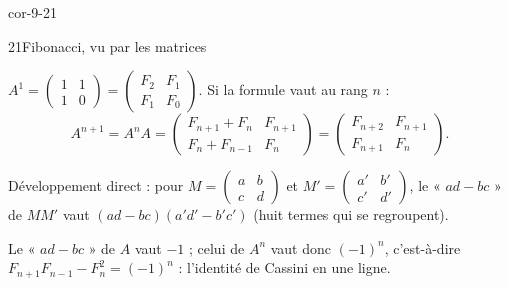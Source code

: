 \begin{blocLivre}{cor-9-21}
\begin{corrige}{21}{Fibonacci, vu par les matrices}
\begin{questions}
  \item {} $A^{1}=\begin{pmatrix}1&1\\1&0\end{pmatrix}
    =\begin{pmatrix}F_2&F_1\\F_1&F_0\end{pmatrix}$.
     Si la formule vaut au rang $n$ :
    \[
      A^{n+1}=A^{n}A=\begin{pmatrix}F_{n+1}+F_n&F_{n+1}\\
      F_n+F_{n-1}&F_n\end{pmatrix}
      =\begin{pmatrix}F_{n+2}&F_{n+1}\\F_{n+1}&F_n\end{pmatrix}.
    \]
  \item Développement direct : pour
    $M=\begin{pmatrix}a&b\\c&d\end{pmatrix}$ et
    $M'=\begin{pmatrix}a'&b'\\c'&d'\end{pmatrix}$, le « $ad-bc$ » de
    $MM'$ vaut $(ad-bc)(a'd'-b'c')$ (huit termes qui se regroupent).
  \item Le « $ad-bc$ » de $A$ vaut $-1$ ; celui de $A^{n}$ vaut donc
    $(-1)^{n}$, c'est-à-dire
    $F_{n+1}F_{n-1}-F_n^{2}=(-1)^{n}$ : l'identité de Cassini en une
    ligne.
\end{questions}
\end{corrige}
\end{blocLivre}

